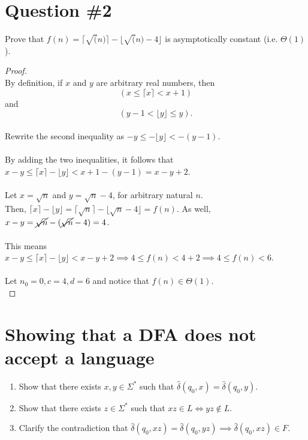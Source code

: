 \documentclass[12pt]{article}
\begin{document}
\section*{Question \#2}
Prove that \( f(n) = \lceil \sqrt(n) \rceil - \lfloor \sqrt(n) - 4 \rfloor\) is asymptotically constant (i.e. \( \Theta(1)\)).
\begin{proof}
\leavevmode\\
    By definition, if \(x\) and \(y\) are arbitrary real numbers, then \[ (x \leq \lceil x \rceil < x + 1) \] and \[ (y - 1 < \lfloor y \rfloor \leq y) \text{.} \] \\
    Rewrite the second inequality as \( -y \leq - \lfloor y \rfloor < - (y - 1) \). \\
    \\
    By adding the two inequalities, it follows that \( x - y \leq \lceil x \rceil - \lfloor y \rfloor < x + 1 - (y - 1) = x - y + 2 \). \\
    \\
    Let \( x = \sqrt{n} \) and \( y = \sqrt{n} - 4 \), for arbitrary natural \( n \). \\
    Then, \( \lceil x \rceil - \lfloor y \rfloor = \lceil \sqrt{n} \rceil - \lfloor \sqrt{n} - 4 \rfloor = f(n) \). As well, \( x - y = \cancel{\sqrt{n}} - (\cancel{\sqrt{n}} - 4) = 4 \). \\
    \\
    This means \( x - y \leq \lceil x \rceil - \lfloor y \rfloor < x - y + 2 \implies 4 \leq f(n) < 4 + 2 \implies 4 \leq f(n) < 6 \). \\
    \\
    Let \( n_0 = 0, c = 4, d = 6 \) and notice that \( f(n) \in \Theta(1) \). \\
\end{proof}
\pagebreak

\section*{Showing that a DFA does not accept a language}
\begin{enumerate}
    \item Show that there exists \( x, y \in \Sigma ^* \) such that \( \hat{\delta}(q_0, x) = \hat{\delta}(q_0, y) \).
    \item Show that there exists \( z \in \Sigma^* \) such that \( xz \in L \iff yz \notin L \).
    \item Clarify the contradiction that \( \hat{\delta}(q_0, xz) = \hat{\delta}(q_0, yz) \implies \hat{\delta}(q_0, xz) \in F \).
\end{enumerate}
\pagebreak
\end{document}
